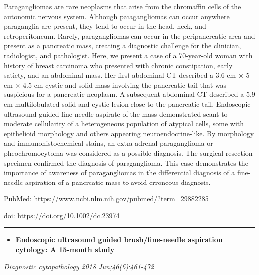 \documentclass[]{article}
\providecommand{\tightlist}{%
  \setlength{\itemsep}{0pt}\setlength{\parskip}{0pt}}
\begin{document}
Paragangliomas are rare neoplasms that arise from the chromaffin cells
of the autonomic nervous system. Although paragangliomas can occur
anywhere paraganglia are present, they tend to occur in the head, neck,
and retroperitoneum. Rarely, paragangliomas can occur in the
peripancreatic area and present as a pancreatic mass, creating a
diagnostic challenge for the clinician, radiologist, and pathologist.
Here, we present a case of a 70-year-old woman with history of breast
carcinoma who presented with chronic constipation, early satiety, and an
abdominal mass. Her first abdominal CT described a 3.6 cm × 5 cm × 4.5
cm cystic and solid mass involving the pancreatic tail that was
suspicious for a pancreatic neoplasm. A subsequent abdominal CT
described a 5.9 cm multilobulated solid and cystic lesion close to the
pancreatic tail. Endoscopic ultrasound-guided fine-needle aspirate of
the mass demonstrated scant to moderate cellularity of a heterogeneous
population of atypical cells, some with epithelioid morphology and
others appearing neuroendocrine-like. By morphology and
immunohistochemical stains, an extra-adrenal paraganglioma or
pheochromocytoma was considered as a possible diagnosis. The surgical
resection specimen confirmed the diagnosis of paraganglioma. This case
demonstrates the importance of awareness of paragangliomas in the
differential diagnosis of a fine-needle aspiration of a pancreatic mass
to avoid erroneous diagnosis.

PubMed: \url{https://www.ncbi.nlm.nih.gov/pubmed/?term=29882285}

doi: \url{https://doi.org/10.1002/dc.23974}

{}

{}

\begin{center}\rule{0.5\linewidth}{\linethickness}\end{center}

\begin{itemize}
\tightlist
\item
  \textbf{Endoscopic ultrasound guided brush/fine-needle aspiration
  cytology: A 15-month study}
\end{itemize}

\emph{Diagnostic cytopathology 2018 Jun;46(6):461-472}
\end{document}
